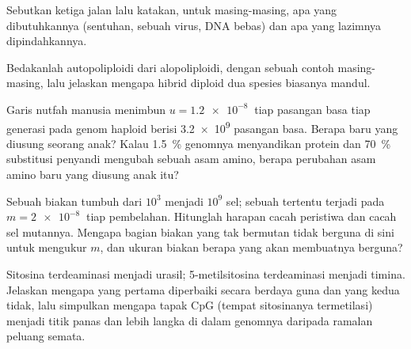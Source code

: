 \begin{exercise}[$\star$]\label{exo:b2:genome-diversification:3}
Sebutkan ketiga jalan  lalu katakan, untuk
masing-masing, apa yang dibutuhkannya (sentuhan, sebuah virus, DNA
bebas) dan apa yang lazimnya dipindahkannya.
\end{exercise}

\begin{exercise}[$\star$]\label{exo:b2:genome-diversification:4}
Bedakanlah autopoliploidi dari alopoliploidi, dengan sebuah contoh
masing-masing, lalu jelaskan mengapa hibrid diploid dua spesies
biasanya mandul.
\end{exercise}

\begin{exercise}[$\star\star$]\label{exo:b2:genome-diversification:5}
Garis nutfah manusia menimbun $u = \qty{1.2e-8}{}$  tiap
pasangan basa tiap generasi pada genom haploid berisi \qty{3.2e9}{}
pasangan basa. Berapa  baru yang diusung seorang anak? Kalau
\qty{1.5}{\%} genomnya menyandikan protein dan \qty{70}{\%} substitusi
penyandi mengubah sebuah asam amino, berapa perubahan asam amino baru
yang diusung anak itu?
\end{exercise}

\begin{exercise}[$\star\star$]\label{exo:b2:genome-diversification:6}
Sebuah biakan tumbuh dari $10^{3}$ menjadi $10^{9}$ sel; sebuah 
tertentu terjadi pada $m = \qty{2e-8}{}$ tiap pembelahan. Hitunglah
harapan cacah peristiwa  dan cacah sel mutannya. Mengapa bagian
biakan yang tak bermutan tidak berguna di sini untuk mengukur $m$, dan
ukuran biakan berapa yang akan membuatnya berguna?
\end{exercise}

\begin{exercise}[$\star\star$]\label{exo:b2:genome-diversification:7}
Sitosina terdeaminasi menjadi urasil; 5-metilsitosina terdeaminasi
menjadi timina. Jelaskan mengapa yang pertama diperbaiki secara
berdaya guna dan yang kedua tidak, lalu simpulkan mengapa tapak CpG
(tempat sitosinanya termetilasi) menjadi titik panas  dan lebih
langka di dalam genomnya daripada ramalan peluang semata.
\end{exercise}


